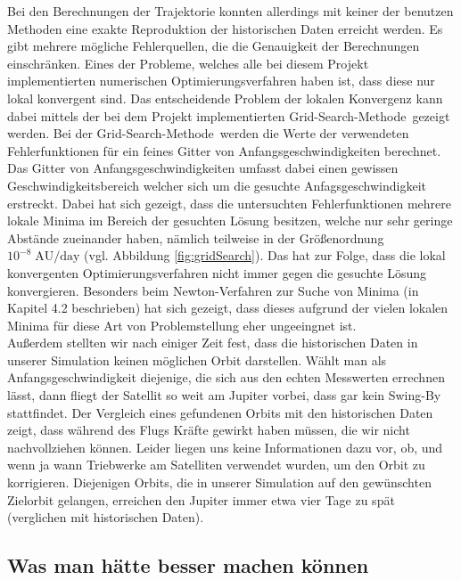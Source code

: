 Bei den Berechnungen der Trajektorie konnten allerdings mit keiner der benutzen Methoden eine exakte Reproduktion der historischen Daten erreicht werden. Es gibt mehrere mögliche Fehlerquellen, die die Genauigkeit der Berechnungen einschränken. Eines der Probleme, welches alle bei diesem Projekt implementierten numerischen Optimierungsverfahren haben ist, dass diese nur lokal konvergent sind. Das entscheidende  Problem der lokalen Konvergenz kann dabei mittels der bei dem Projekt implementierten \glqq Grid-Search-Methode\grqq\, gezeigt werden. Bei der \glqq Grid-Search-Methode\grqq\, werden die Werte der verwendeten Fehlerfunktionen für ein feines Gitter von Anfangsgeschwindigkeiten berechnet. Das Gitter von Anfangsgeschwindigkeiten umfasst dabei einen gewissen Geschwindigkeitsbereich welcher sich um die gesuchte Anfagsgeschwindigkeit erstreckt. Dabei hat sich gezeigt, dass die untersuchten Fehlerfunktionen mehrere lokale Minima im Bereich der gesuchten Lösung besitzen, welche nur sehr geringe Abstände zueinander haben, nämlich teilweise in der Größenordnung $10^{-8}\;\text{AU/day}$ (vgl. Abbildung \ref{fig:gridSearch}). Das hat zur Folge, dass die lokal konvergenten Optimierungsverfahren nicht immer gegen die gesuchte Lösung konvergieren. Besonders beim Newton-Verfahren zur Suche von Minima (in Kapitel 4.2 beschrieben) hat sich gezeigt, dass dieses aufgrund der vielen lokalen Minima für diese Art von Problemstellung eher ungeeingnet ist.\\
Außerdem stellten wir nach einiger Zeit fest, dass die historischen Daten in unserer Simulation keinen möglichen Orbit darstellen. Wählt man als Anfangsgeschwindigkeit diejenige, die sich aus den echten Messwerten errechnen lässt, dann fliegt der Satellit so weit am Jupiter vorbei, dass gar kein Swing-By stattfindet. Der Vergleich eines gefundenen Orbits mit den historischen Daten zeigt, dass während des Flugs Kräfte gewirkt haben müssen, die wir nicht nachvollziehen können. Leider liegen uns keine Informationen dazu vor, ob, und wenn ja wann Triebwerke am Satelliten verwendet wurden, um den Orbit zu korrigieren. Diejenigen Orbits, die in unserer Simulation auf den gewünschten Zielorbit gelangen, erreichen den Jupiter immer etwa vier Tage zu spät (verglichen mit historischen Daten).

\subsection{Was man hätte besser machen können}

